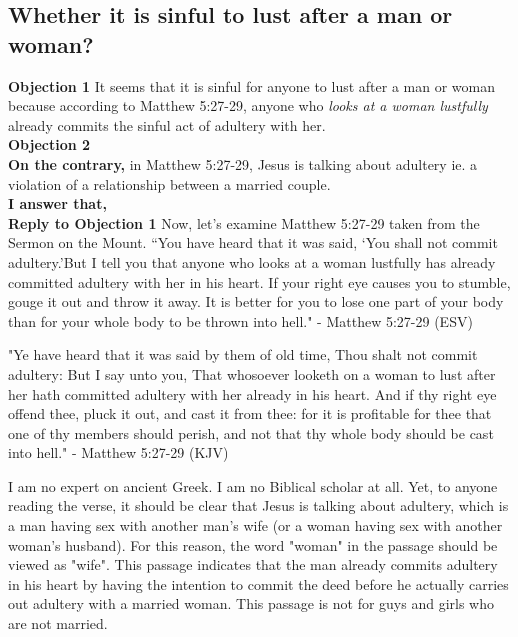 \documentclass[a4paper, parskip=full, 12pt]{article}
\begin{document}
\subsection{Whether it is sinful to lust after a man or woman?}
\textbf{Objection 1} It seems that it is sinful for anyone to lust after a man or woman because according to Matthew 5:27-29, anyone who \textit{looks at a woman lustfully} already commits the sinful act of adultery with her. \\
\textbf{Objection 2} \\
\textbf{On the contrary,} in Matthew 5:27-29, Jesus is talking about adultery ie. a violation of a relationship between a married couple.\\
\textbf{I answer that,} \\
\textbf{Reply to Objection 1} Now, let's examine Matthew 5:27-29 taken from the Sermon on the Mount.
“You have heard that it was said, ‘You shall not commit adultery.’But I tell you that anyone who looks at a woman lustfully has already committed adultery with her in his heart. If your right eye causes you to stumble, gouge it out and throw it away. It is better for you to lose one part of your body than for your whole body to be thrown into hell." - Matthew 5:27-29 (ESV)

"Ye have heard that it was said by them of old time, Thou shalt not commit adultery: But I say unto you, That whosoever looketh on a woman to lust after her hath committed adultery with her already in his heart. And if thy right eye offend thee, pluck it out, and cast it from thee: for it is profitable for thee that one of thy members should perish, and not that thy whole body should be cast into hell." - Matthew 5:27-29 (KJV)

I am no expert on ancient Greek. I am no Biblical scholar at all. Yet, to anyone reading the verse, it should be clear that Jesus is talking about adultery, which is a man having sex with another man's wife (or a woman having sex with another woman's husband). For this reason, the word "woman" in the passage should be viewed as "wife". This passage indicates that the man already commits adultery in his heart by having the intention to commit the deed before he actually carries out adultery with a married woman. This passage is not for guys and girls who are not married. \\
\end{document}
